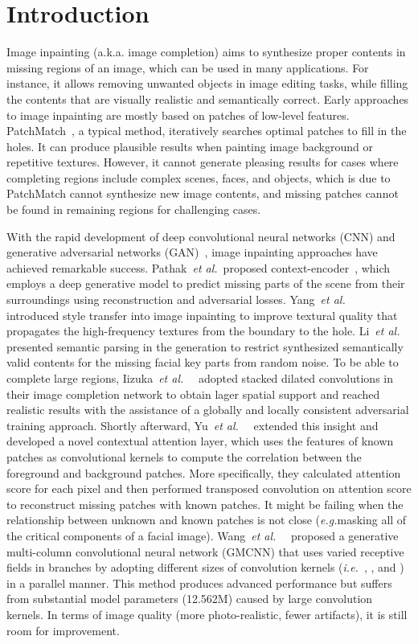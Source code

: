 \documentclass[journal]{IEEEtran}
\newcommand{\etal}{\emph{et al.}~}
\newcommand{\ie}{\emph{i.e.}}
\newcommand{\eg}{\emph{e.g.}}
\begin{document}
\IEEEpeerreviewmaketitle


\section{Introduction}
Image inpainting (a.k.a. image completion) aims to synthesize proper contents in missing regions of an image, which can be used in many applications. For instance, it allows removing unwanted objects in image editing tasks, while filling the contents that are visually realistic and semantically correct. Early approaches to image inpainting are mostly based on patches of low-level features. PatchMatch~\cite{patch-match}, a typical method, iteratively searches optimal patches to fill in the holes. It can produce plausible results when painting image background or repetitive textures. However, it cannot generate pleasing results for cases where completing regions include complex scenes, faces, and objects, which is due to PatchMatch cannot synthesize new image contents, and missing patches cannot be found in remaining regions for challenging cases.

With the rapid development of deep convolutional neural networks (CNN) and generative adversarial networks (GAN)~\cite{GAN}, image inpainting approaches have achieved remarkable success. Pathak~\etal proposed context-encoder~\cite{CE}, which employs a deep generative model to predict missing parts of the scene from their surroundings using reconstruction and adversarial losses. Yang~\etal~\cite{high-resolution-multi-scale} introduced style transfer into image inpainting to improve textural quality that propagates the high-frequency textures from the boundary to the hole. Li~\etal~\cite{GFC} presented semantic parsing in the generation to restrict synthesized semantically valid contents for the missing facial key parts from random noise. To be able to complete large regions, Iizuka~\etal~\cite{globally-and-locally} adopted stacked dilated convolutions in their image completion network to obtain lager spatial support and reached realistic results with the assistance of a globally and locally consistent adversarial training approach. Shortly afterward, Yu~\etal~\cite{contextual-attention} extended this insight and developed a novel contextual attention layer, which uses the features of known patches as convolutional kernels to compute the correlation between the foreground and background patches. More specifically, they calculated attention score for each pixel and then performed transposed convolution on attention score to reconstruct missing patches with known patches. It might be failing when the relationship between unknown and known patches is not close (\eg masking all of the critical components of a facial image). Wang~\etal~\cite{GMCNN} proposed a generative multi-column convolutional neural network (GMCNN) that uses varied receptive fields in branches by adopting different sizes of convolution kernels (\ie~, , and ) in a parallel manner. This method produces advanced performance but suffers from substantial model parameters (12.562M) caused by large convolution kernels. In terms of image quality (more photo-realistic, fewer artifacts), it is still room for improvement.
\end{document}
